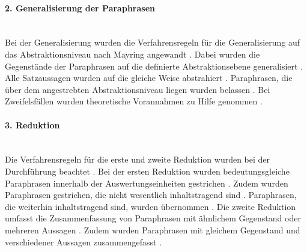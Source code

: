 \paragraph{2. Generalisierung der Paraphrasen}\mbox{} \\
Bei der Generalisierung wurden die Verfahrensregeln für die Generalisierung auf das Abstraktionsniveau nach Mayring angewandt \cite{mayring2019qualitative}. Dabei wurden die Gegenstände der Paraphrasen auf die definierte Abstraktionsebene generalisiert \cite{mayring2019qualitative}. Alle Satzaussagen wurden auf die gleiche Weise abstrahiert \cite{mayring2019qualitative}. Paraphrasen, die über dem angestrebten Abstraktionsniveau liegen wurden belassen \cite{mayring2019qualitative}. Bei Zweifelsfällen wurden theoretische Vorannahmen zu Hilfe genommen \cite{mayring2019qualitative}.
\paragraph{3. Reduktion}\mbox{} \\
Die Verfahrensregeln für die erste und zweite Reduktion wurden bei der Durchführung beachtet \cite{mayring2019qualitative}. Bei der ersten Reduktion wurden bedeutungsgleiche Paraphrasen innerhalb der Auswertungseinheiten gestrichen \cite{mayring2019qualitative}. Zudem wurden Paraphrasen gestrichen, die nicht wesentlich inhaltstragend sind \cite{mayring2019qualitative}. Paraphrasen, die weiterhin inhaltstragend sind, wurden übernommen \cite{mayring2019qualitative}. Die zweite Reduktion umfasst die Zusammenfassung von Paraphrasen mit ähnlichem Gegenstand oder mehreren Aussagen \cite{mayring2019qualitative}. Zudem wurden Paraphrasen mit gleichem Gegenstand und verschiedener Aussagen zusammengefasst \cite{mayring2019qualitative}.

